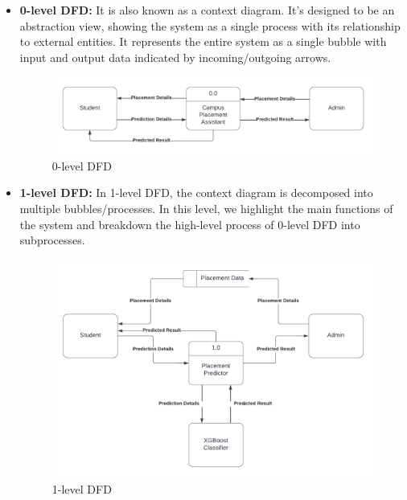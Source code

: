 \documentclass[12pt]{article}
\begin{document}
\begin{itemize}

\item \textbf{0-level DFD: }
It is also known as a context diagram. It’s designed to be an abstraction view, showing the system as a single process with its relationship to external entities. It represents the entire system as a single bubble with input and output data indicated by incoming/outgoing arrows. 

\begin{figure}[H]
\begin{center}
\includegraphics[scale=0.8]{0-LEVEL DFD}
\caption{0-level DFD}
\end{center}
\end{figure}

\item \textbf{1-level DFD: }
In 1-level DFD, the context diagram is decomposed into multiple bubbles/processes. In this level, we highlight the main functions of the system and breakdown the high-level process of 0-level DFD into subprocesses. 

\begin{figure}[H]
\begin{center}
\includegraphics[scale=.8]{1-LEVEL DFD}
\caption{1-level DFD}
\end{center}
\end{figure}


\end{itemize}
\end{document}
